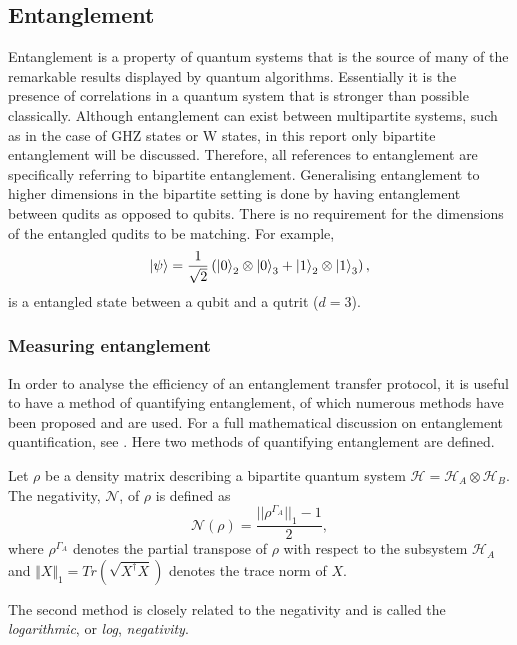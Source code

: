 \subsection{Entanglement}
Entanglement is a property of quantum systems that is the source of many of the remarkable results displayed by quantum algorithms.
Essentially it is the presence of correlations in a quantum system that is stronger than possible classically.
Although entanglement can exist between multipartite systems, such as in the case of GHZ states or W states, in this report only bipartite entanglement will be discussed.
Therefore, all references to entanglement are specifically referring to bipartite entanglement.
Generalising entanglement to higher dimensions in the bipartite setting is done by having entanglement between qudits as opposed to qubits.
There is no requirement for the dimensions of the entangled qudits to be matching.
For example,
\begin{equation}
    \ket{\psi} = \frac{1}{\sqrt{2}}\left(\ket{0}_2\otimes\ket{0}_3 + \ket{1}_2\otimes\ket{1}_3\right),
\end{equation}
is a entangled state between a qubit and a qutrit ($d=3$).

\subsubsection{Measuring entanglement}
\label{subsubsection:measure_entanglement}
In order to analyse the efficiency of an entanglement transfer protocol, it is useful to have a method of quantifying entanglement, of which numerous methods have been proposed and are used.
For a full mathematical discussion on entanglement quantification, see \cite{Plenio_2007}.
Here two methods of quantifying entanglement are defined.
\begin{definition}[Negativity]
    \label{definition:negativity}
    Let $\rho$ be a density matrix describing a bipartite quantum system $\mathcal{H} = \mathcal{H}_A \otimes \mathcal{H}_B$.
    The negativity, $\mathcal{N}$, of $\rho$ is defined as
    \begin{equation}
        \mathcal{N}(\rho) = \frac{||\rho^{\Gamma_A}||_1-1}{2},
    \end{equation}
    where $\rho^{\Gamma_A}$ denotes the partial transpose of $\rho$ with respect to the subsystem $\mathcal{H}_A$ and $\Vert X\Vert_1 = Tr(\sqrt{X^\dagger X})$ denotes the trace norm of $X$.
\end{definition}
The second method is closely related to the negativity and is called the \emph{logarithmic}, or \emph{log}, \emph{negativity}.

